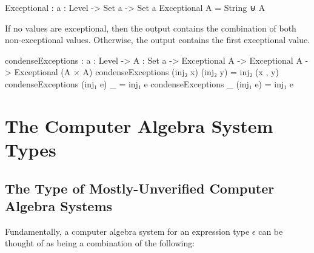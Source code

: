 \documentclass{report}
\begin{document}
\begin{code}
Exceptional : {a : Level} -> Set a -> Set a
Exceptional A = String ⊎ A
\end{code}

If no values are exceptional, then the output contains the combination of both non-exceptional values.  Otherwise, the output contains the first exceptional value.

\begin{code}
condenseExceptions : {a : Level} ->
                     {A : Set a} ->
                     Exceptional A ->
                     Exceptional A ->
                     Exceptional (A × A)
condenseExceptions (inj₂ x) (inj₂ y) = inj₂ (x , y)
condenseExceptions (inj₁ e) _ = inj₁ e
condenseExceptions _ (inj₁ e) = inj₁ e
\end{code}

\chapter{The Computer Algebra System Types}

\section{The Type of Mostly-Unverified Computer Algebra Systems}
Fundamentally, a computer algebra system for an expression type \(\epsilon\) can be thought of as being a combination of the following:
\end{document}
